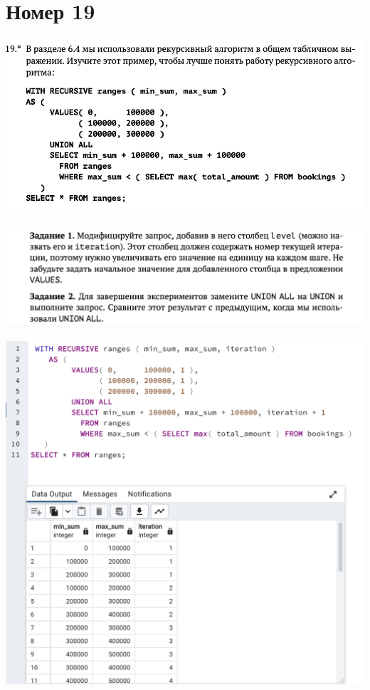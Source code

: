 \documentclass[a4paper,12pt]{article}
\begin{document}
\section*{Номер 19}
\includegraphics[scale=0.6]{t191.png}
\\\\
\includegraphics[scale=0.6]{t192.png}
\\\\
\includegraphics[scale=0.6]{191.png}
\end{document}
